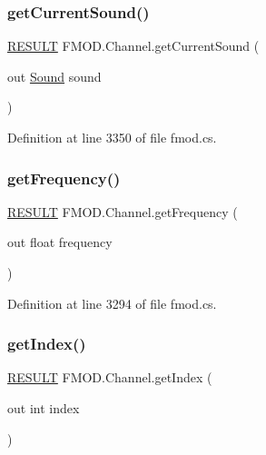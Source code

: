 \subsubsection{\texorpdfstring{get\+Current\+Sound()}{getCurrentSound()}}
{\footnotesize\ttfamily \hyperlink{namespace_f_m_o_d_a305d1176ef3f8c8815861a60407ac33d}{R\+E\+S\+U\+LT} F\+M\+O\+D.\+Channel.\+get\+Current\+Sound (\begin{DoxyParamCaption}\item[{out \hyperlink{class_f_m_o_d_1_1_sound}{Sound}}]{sound }\end{DoxyParamCaption})}



Definition at line 3350 of file fmod.\+cs.

\mbox{\label{class_f_m_o_d_1_1_channel_a69cfa0718c64b66ef8d9ff31259f8a99}} 
\subsubsection{\texorpdfstring{get\+Frequency()}{getFrequency()}}
{\footnotesize\ttfamily \hyperlink{namespace_f_m_o_d_a305d1176ef3f8c8815861a60407ac33d}{R\+E\+S\+U\+LT} F\+M\+O\+D.\+Channel.\+get\+Frequency (\begin{DoxyParamCaption}\item[{out float}]{frequency }\end{DoxyParamCaption})}



Definition at line 3294 of file fmod.\+cs.

\mbox{\label{class_f_m_o_d_1_1_channel_af87fdd737e5b5fe294660a892d33d232}} 
\subsubsection{\texorpdfstring{get\+Index()}{getIndex()}}
{\footnotesize\ttfamily \hyperlink{namespace_f_m_o_d_a305d1176ef3f8c8815861a60407ac33d}{R\+E\+S\+U\+LT} F\+M\+O\+D.\+Channel.\+get\+Index (\begin{DoxyParamCaption}\item[{out int}]{index }\end{DoxyParamCaption})}



